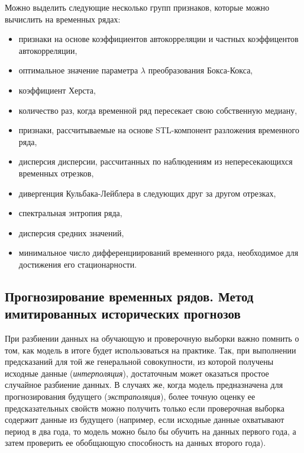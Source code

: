 \documentclass[%
	11pt,
	a4paper,
	utf8,
		]{article}
\begin{document}
Можно выделить следующие несколько групп признаков, которые можно вычислить на временных рядах:
\begin{itemize}
	\item признаки на основе коэффициентов автокорреляции и частных коэффицентов автокорреляции,
	
	\item оптимальное значение параметра $ \lambda $ преобразования Бокса-Кокса,
	
	\item коэффициент Херста,
	
	\item количество раз, когда временной ряд пересекает свою собственную медиану,
	
	\item признаки, рассчитываемые на основе STL-компонент разложения временного ряда,
	
	\item дисперсия дисперсии, рассчитанных по наблюдениям из непересекающихся временных отрезков,
	
	\item дивергенция Кульбака-Лейблера в следующих друг за другом отрезках,
	
	\item спектральная энтропия ряда,
	
	\item дисперсия средних значений,
	
	\item минимальное число дифференциирований временного ряда, необходимое для достижения его стационарности.
\end{itemize}

\subsection{Прогнозирование временных рядов. Метод имитированных исторических прогнозов}

При разбиении данных на обучающую и проверочную выборки важно помнить о том, как модель в итоге будет использоваться на практике. Так, при выполнении предсказаний для той же генеральной совокупности, из которой получены исходные данные (\emph{интерполяция}), достаточным может оказаться простое случайное разбиение данных. В случаях же, когда модель предназначена для прогнозирования будущего (\emph{экстраполяция}), более точную оценку ее предсказательных свойств можно получить только если проверочная выборка содержит данные из будущего (например, если исходные данные охватывают период в два года, то модель можно было бы обучить на данных первого года, а затем проверить ее обобщающую способность на данных второго года).
\end{document}
